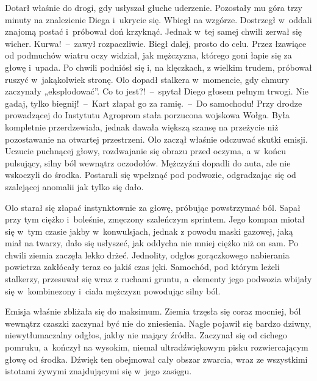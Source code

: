\documentclass[../MAIN.tex]{subfiles}
\begin{document}
Dotarł właśnie do drogi, gdy usłyszał głuche uderzenie. Pozostały mu góra trzy minuty na znalezienie Diega i~ukrycie się. Wbiegł na wzgórze. Dostrzegł w~oddali znajomą postać i~próbował doń krzyknąć. Jednak w~tej samej chwili zerwał się wicher.
\sx Kurwa!~--~zawył rozpaczliwie.
\qm
Biegł dalej, prosto do celu. Przez łzawiące od podmuchów wiatru oczy widział, jak mężczyzna, którego goni łapie się za głowę i~upada. Po chwili podniósł się i, na klęczkach, z wielkim trudem, próbował ruszyć w~jakąkolwiek stronę. Olo dopadł stalkera w~momencie, gdy chmury zaczynały „eksplodować”.
\sx Co to jest?!~--~spytał Diego głosem pełnym trwogi.
\xx Nie gadaj, tylko biegnij!~--~Kart złapał go za ramię.~--~Do samochodu!
\qm
Przy drodze prowadzącej do Instytutu Agroprom stała porzucona wojskowa Wołga. Była kompletnie przerdzewiała, jednak dawała większą szansę na przeżycie niż pozostawanie na otwartej przestrzeni. Olo zaczął właśnie odczuwać skutki emisji. Uczucie puchnącej głowy, rozdwajanie się obrazu przed oczyma, a w~koń\-cu pulsujący, silny ból wewnątrz oczodołów. Mężczyźni dopadli do auta, ale nie wskoczyli do środka. Postarali się wpełznąć pod podwozie, odgradzając się od szalejącej anomalii jak tylko się dało.

Olo starał się złapać instynktownie za głowę, próbując powstrzymać ból. Sapał przy tym ciężko i~boleśnie, zmęczony szaleńczym sprintem. Jego kompan miotał się w~tym czasie jakby w~konwulsjach, jednak z powodu maski gazowej, jaką miał na twarzy, dało się usłyszeć, jak oddycha nie mniej ciężko niż on sam. Po chwili ziemia zaczęła lekko drżeć. Jednolity, odgłos gorączkowego nabierania powietrza zakłócały teraz co jakiś czas jęki. Samochód, pod którym leżeli stalkerzy, przesuwał się wraz z ruchami gruntu, a~elementy jego podwozia wbijały się w~kombinezony i~ciała mężczyzn powodując silny ból.

Emisja właśnie zbliżała się do maksimum. Ziemia trzęsła się coraz mocniej, ból wewnątrz czaszki zaczynał być nie do zniesienia. Nagle pojawił się bardzo dziwny, niewytłumaczalny odgłos, jakby nie mający źródła. Zaczynał się od cichego pomruku, a~kończył na wysokim, niemal ultradźwiękowym pisku rozwiercającym głowę od środka. Dźwięk ten obejmował cały obszar zwarcia, wraz ze wszystkimi istotami żywymi znajdującymi się w~jego zasięgu.
\end{document}
